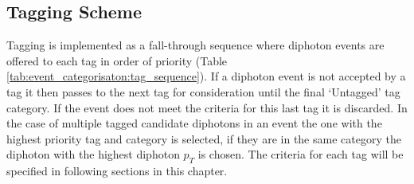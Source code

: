 \subsection{Tagging Scheme}
Tagging is implemented as a fall-through sequence where diphoton events are offered to each tag in order of priority (Table \ref{tab:event_categorisaton:tag_sequence}). 
If a diphoton event is not accepted by a tag it then passes to the next tag for consideration until the final `Untagged' tag category. 
If the event does not meet the criteria for this last tag it is discarded.
In the case of multiple tagged candidate diphotons in an event the one with the highest priority tag and category is selected, if they are in the same category the diphoton with the highest diphoton $p_{T}$ is chosen.
The criteria for each tag will be specified in following sections in this chapter.
\begin{table}[h!]
    \centering
    \caption{The \Hgg tag sequence in order of tag priority from highest (top) to lowest (bottom).}
    \label{tab:event_categorisaton:tag_sequence}
\end{table}







